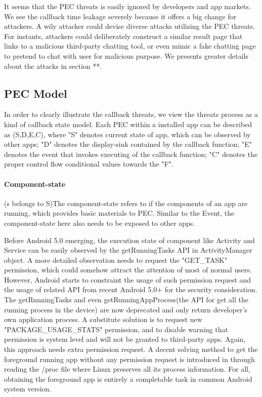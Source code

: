 It seems that the PEC threats is easily ignored by developers and app markets. We see the callback time leakage severely because it offers a big change for attackers. A wily attacker could devise diverse attacks utilizing the PEC threats. For instants, attackers could deliberately construct a similar result page that links to a malicious third-party chatting tool, or even mimic a fake chatting page to pretend to chat with user for malicious purpose. We presents greater details about the attacks in section **.

\subsection{PEC Model} 

In order to clearly illustrate the callback threats, we view the threats process as a kind of callback state model. Each PEC within a installed app can be described as (S,D,E,C), where "S" denotes current state of app, which can be observed by other apps; "D" denotes the display-sink contained by the callback function; "E" denotes the event that invokes executing of the callback function; "C" denotes the proper control flow conditional values towards the "F".

\paragraph{Component-state}

(s belongs to S)The component-state refers to if the components of an app are running, which provides basic materials to PEC. Similar to the Event, the component-state here also needs to be exposed to other apps.

Before {\color{red}Android 5.0} emerging, the execution state of component like Activity and Service can be easily observed by the {\color{red}getRunningTasks API in ActivityManager object}. A more detailed observation needs to request the "GET\_TASK" permission, which could somehow attract the attention of most of normal users. However, Android starts to constraint the usage of such permission request and the usage of related API from recent {\color{red}Android 5.0+} for the security consideration. The getRunningTasks and even getRunningAppProcess(the API for get all the running process in the device) are now deprecated and only return developer's own application process. {\color{red}A substitute solution is to request new "PACKAGE\_USAGE\_STATS" permission, and to disable warning that permission is system level and will not be granted to third-party apps. Again, this approach needs extra permission request. } A decent solving method to get the foreground running app without any permission request is introduced in  \cite{getforeground} through reading the /proc file where Linux preserves all its process information. For all, obtaining the foreground app is entirely a completable task in common Android system version. 

